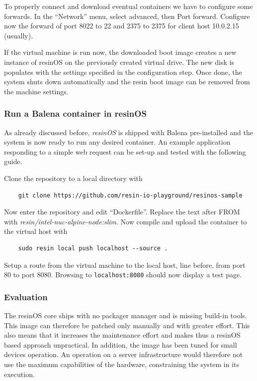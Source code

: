 \documentclass[]{scrartcl}
\begin{document}
To properly connect and download eventual containers we have to configure some forwards. In the ``Network'' menu, select advanced, then Port forward. Configure now the forward of port 8022 to 22  and 2375 to 2375 for client host 10.0.2.15 (usually).

If the virtual machine is run now, the downloaded boot image creates a new instance of resinOS on the previously created virtual drive. The new disk is populates with the settings specified in the configuration step. Once done, the system shuts down automatically and the resin boot image can be removed from the machine settings.

\subsubsection{Run a Balena container in resinOS}

As already discussed before, \textit{resinOS} is shipped with Balena pre-installed and the system is now ready to run any desired container. 
An example application responding to a simple web request can be set-up and tested with the following guide.

Clone the repository to a local directory with
\begin{verbatim}
	git clone https://github.com/resin-io-playground/resinos-sample
\end{verbatim}

Now enter the repository and edit ``Dockerfile''. Replace the text after FROM with \textit{resin/intel-nuc-alpine-node:slim}. Now compile and upload the container to the virtual host with

\begin{verbatim}
	sudo resin local push localhost --source .
\end{verbatim}

Setup a route from the virtual machine to the local host, line before, from port 80 to port 8080. Browsing to \texttt{localhost:8080} should now display a test page.

\subsubsection{Evaluation}

The resinOS core ships with no packager manager and is missing build-in tools. This image can therefore be patched only manually and with greater effort. This also means that it increases the maintenance effort and makes thus a resinOS based approach unpractical. In addition, the image has been tuned for small devices operation. An operation on a server infrastructure would therefore not use the maximum capabilities of the hardware, constraining the system in its execution.
\end{document}
